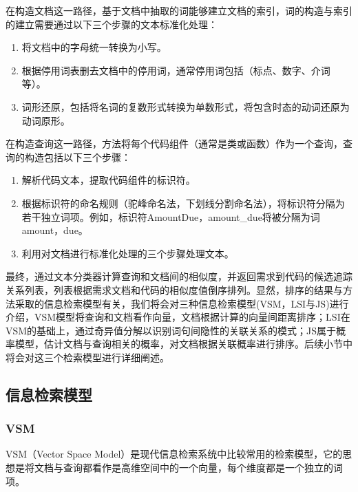 在构造文档这一路径，基于文档中抽取的词能够建立文档的索引，词的构造与索引的建立需要通过以下三个步骤的文本标准化处理：
\begin{enumerate}
  \item 将文档中的字母统一转换为小写。

  \item 根据停用词表删去文档中的停用词，通常停用词包括（标点、数字、介词等）。

  \item 词形还原，包括将名词的复数形式转换为单数形式，将包含时态的动词还原为动词原形。
\end{enumerate}
在构造查询这一路径，方法将每个代码组件（通常是类或函数）作为一个查询，查询的构造包括以下三个步骤：
\begin{enumerate}
  \item 解析代码文本，提取代码组件的标识符。

  \item 根据标识符的命名规则（驼峰命名法，下划线分割命名法），将标识符分隔为若干独立词项。例如，标识符AmountDue，amount\_due将被分隔为词amount，due。

  \item 利用对文档进行标准化处理的三个步骤处理文本。
\end{enumerate}
最终，通过文本分类器计算查询和文档间的相似度，并返回需求到代码的候选追踪关系列表，列表根据需求文档和代码的相似度值倒序排列。显然，排序的结果与方法采取的信息检索模型有关，我们将会对三种信息检索模型(VSM，LSI与JS)进行介绍，VSM模型将查询和文档看作向量，文档根据计算的向量间距离排序；LSI在VSM的基础上，通过奇异值分解以识别词句间隐性的关联关系的模式；JS属于概率模型，估计文档与查询相关的概率，对文档根据关联概率进行排序。后续小节中将会对这三个检索模型进行详细阐述。

\subsection{信息检索模型}

\subsubsection{VSM}
VSM（Vector Space Model）是现代信息检索系统中比较常用的检索模型，它的思想是将文档与查询都看作是高维空间中的一个向量，每个维度都是一个独立的词项。

